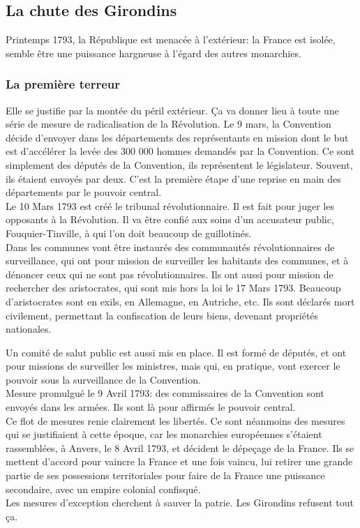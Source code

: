 \documentclass[10pt, a4paper, openany]{book}
\begin{document}
\subsection{La chute des Girondins}

Printemps 1793, la République est menacée à l'extérieur: la France est isolée, semble être une puissance hargneuse à l'égard des autres monarchies.

\subsubsection{La première terreur}

Elle se justifie par la montée du péril extérieur. Ça va donner lieu à toute une série de mesure de radicalisation de la Révolution. Le 9 mars, la Convention décide d'envoyer dans les départements des représentants en mission dont le but est d'accélérer la levée des 300 000 hommes demandés par la Convention. Ce sont simplement des députés de la Convention, ils représentent le législateur. Souvent, ils étaient envoyés par deux. C'est la première étape d'une reprise en main des départements par le pouvoir central. \\
Le 10 Mars 1793 est créé le tribunal révolutionnaire. Il est fait pour juger les opposants à la Révolution. Il va être confié aux soins d'un accusateur public, Fouquier-Tinville, à qui l'on doit beaucoup de guillotinés. \\
Dans les communes vont être instaurés des communautés révolutionnaires de surveillance, qui ont pour mission de surveiller les habitants des communes, et à dénoncer ceux qui ne sont pas révolutionnaires. Ils ont aussi pour mission de rechercher des aristocrates, qui sont mis hors la loi le 17 Mars 1793. Beaucoup d'aristocrates sont en exils, en Allemagne, en Autriche, etc. Ils sont déclarés mort civilement, permettant la confiscation de leurs biens, devenant propriétés nationales.


Un comité de salut public est aussi mis en place. Il est formé de députés, et ont pour missions de surveiller les ministres, mais qui, en pratique, vont exercer le pouvoir sous la surveillance de la Convention. \\
Mesure promulgué le 9 Avril 1793: des commissaires de la Convention sont envoyés dans les armées. Ils sont là pour affirmés le pouvoir central. \\
Ce flot de mesures renie clairement les libertés. Ce sont néanmoins des mesures qui se justifiaient à cette époque, car les monarchies européennes s'étaient rassemblées, à Anvers, le 8 Avril 1793, et décident le dépeçage de la France. Ils se mettent d'accord pour vaincre la France et une fois vaincu, lui retirer une grande partie de ses possessions territoriales pour faire de la France une puissance secondaire, avec un empire colonial confisqué. \\
Les mesures d'exception cherchent à sauver la patrie. Les Girondins refusent tout ça.
\end{document}
